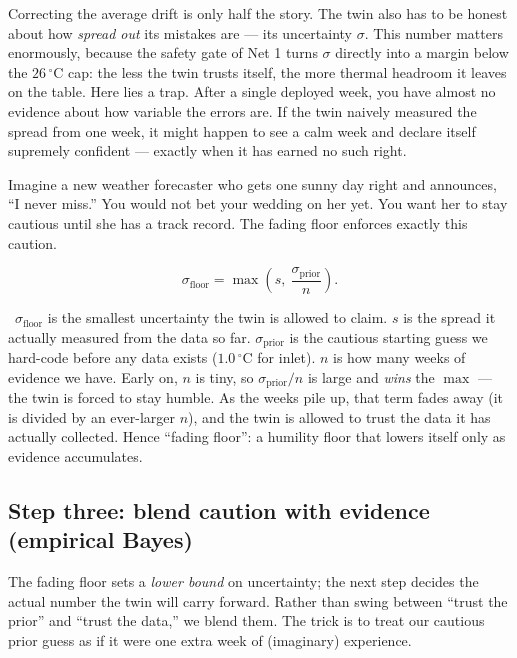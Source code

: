 \documentclass[11pt]{report}
\newcommand{\plainwords}[1]{\par\smallskip\noindent{\itshape In plain words.}~#1\par\smallskip}
\begin{document}
Correcting the average drift is only half the story. The twin also has to be honest about how \emph{spread out} its mistakes are --- its uncertainty $\sigma$. This number matters enormously, because the safety gate of Net 1 turns $\sigma$ directly into a margin below the $26\,^\circ$C cap: the less the twin trusts itself, the more thermal headroom it leaves on the table. Here lies a trap. After a single deployed week, you have almost no evidence about how variable the errors are. If the twin naively measured the spread from one week, it might happen to see a calm week and declare itself supremely confident --- exactly when it has earned no such right.

\begin{analogy}
Imagine a new weather forecaster who gets one sunny day right and announces, ``I never miss.'' You would not bet your wedding on her yet. You want her to stay cautious until she has a track record. The fading floor enforces exactly this caution.
\end{analogy}

\begin{equation}\label{eq:fadingfloor}
\sigma_{\text{floor}} = \max\!\left(s,\ \frac{\sigma_{\text{prior}}}{n}\right).
\end{equation}
\plainwords{$\sigma_{\text{floor}}$ is the smallest uncertainty the twin is allowed to claim. $s$ is the spread it actually measured from the data so far. $\sigma_{\text{prior}}$ is the cautious starting guess we hard-code before any data exists ($1.0\,^\circ$C for inlet). $n$ is how many weeks of evidence we have. Early on, $n$ is tiny, so $\sigma_{\text{prior}}/n$ is large and \emph{wins} the $\max$ --- the twin is forced to stay humble. As the weeks pile up, that term fades away (it is divided by an ever-larger $n$), and the twin is allowed to trust the data it has actually collected. Hence ``fading floor'': a humility floor that lowers itself only as evidence accumulates.}

\subsection{Step three: blend caution with evidence (empirical Bayes)}

The fading floor sets a \emph{lower bound} on uncertainty; the next step decides the actual number the twin will carry forward. Rather than swing between ``trust the prior'' and ``trust the data,'' we blend them. The trick is to treat our cautious prior guess as if it were one extra week of (imaginary) experience.
\end{document}
